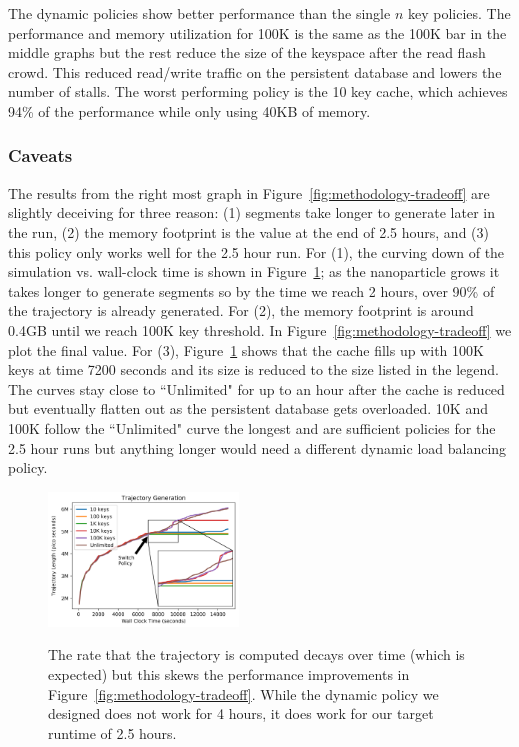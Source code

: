 The dynamic policies show better performance than the single \(n\) key
policies. The performance and memory utilization for 100K is the same as the
100K bar in the middle graphs but the rest reduce the size of the keyspace
after the read flash crowd. This reduced read/write traffic on the
persistent database and lowers the number of stalls.  The worst performing
policy is the 10 key cache, which achieves 94\% of the performance while only
using 40KB of memory. 

\subsubsection*{Caveats}

The results from the right most graph in Figure~\ref{fig:methodology-tradeoff}
are slightly deceiving for three reason: (1) segments take longer to generate
later in the run, (2) the memory footprint is the value at the end of 2.5
hours, and (3) this policy only works well for the 2.5 hour run.  For (1), the
curving down of the simulation vs. wall-clock time is shown in
Figure~\ref{fig:methodology-trajectory}; as the nanoparticle grows it takes
longer to generate segments so by the time we reach 2 hours, over 90\% of the
trajectory is already generated.  For (2), the memory footprint is around 0.4GB
until we reach 100K key threshold. In Figure~\ref{fig:methodology-tradeoff} we plot the
final value. For (3), Figure~\ref{fig:methodology-trajectory} shows that the
cache fills up with 100K keys at time 7200 seconds and its size is reduced to the size
listed in the legend.  The curves stay close to ``Unlimited" for up to an hour
after the cache is reduced but eventually flatten out as the persistent
database gets overloaded. 10K and 100K follow the ``Unlimited" curve the
longest and are sufficient policies for the 2.5 hour runs but anything longer
would need a different dynamic load balancing policy.

\begin{figure}[tbh]
  \noindent\includegraphics[width=0.45\textwidth]{figures/methodology-trajectory.png}\\
  \caption{The rate that the trajectory is computed decays over time (which is
  expected) but this skews the performance improvements in
  Figure~\ref{fig:methodology-tradeoff}. While the dynamic policy we designed
  does not work for 4 hours, it does work for our target
  runtime of 2.5 hours. \label{fig:methodology-trajectory}}
\end{figure}

